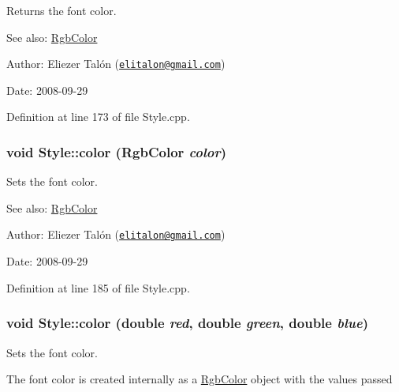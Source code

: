 Returns the font color. 

\begin{Desc}
\item[See also:]\hyperlink{struct_rgb_color}{RgbColor}\end{Desc}
\begin{Desc}
\item[Author:]Eliezer Talón (\href{mailto:elitalon@gmail.com}{\tt elitalon@gmail.com}) \end{Desc}
\begin{Desc}
\item[Date:]2008-09-29 \end{Desc}


Definition at line 173 of file Style.cpp.\hypertarget{class_style_0f557c5b3ea0a3320dd71d476a004bac}{
\subsubsection[color]{\setlength{\rightskip}{0pt plus 5cm}void Style::color ({\bf RgbColor} {\em color})}}
\label{class_style_0f557c5b3ea0a3320dd71d476a004bac}


Sets the font color. 

\begin{Desc}
\item[See also:]\hyperlink{struct_rgb_color}{RgbColor}\end{Desc}
\begin{Desc}
\item[Author:]Eliezer Talón (\href{mailto:elitalon@gmail.com}{\tt elitalon@gmail.com}) \end{Desc}
\begin{Desc}
\item[Date:]2008-09-29 \end{Desc}


Definition at line 185 of file Style.cpp.\hypertarget{class_style_a32d9527a9ce8b50eb8e7d128fce578f}{
\subsubsection[color]{\setlength{\rightskip}{0pt plus 5cm}void Style::color (double {\em red}, \/  double {\em green}, \/  double {\em blue})}}
\label{class_style_a32d9527a9ce8b50eb8e7d128fce578f}


Sets the font color. 

The font color is created internally as a \hyperlink{struct_rgb_color}{RgbColor} object with the values passed

